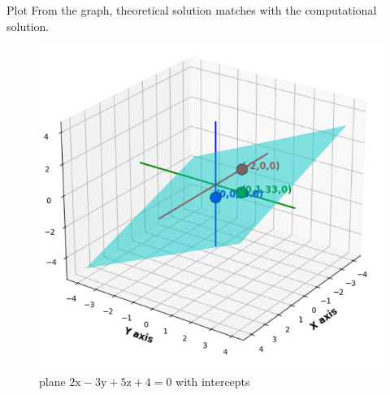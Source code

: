 \documentclass{beamer}
\begin{document}
\begin{frame}{Plot}
  From the graph, theoretical solution matches with the computational solution.

\begin{figure}[H]
\centering
\includegraphics[width=0.5\columnwidth]{figs/graph.png}
\caption*{plane $2\text{x} - 3\text{y} + 5\text{z} + 4 = 0$ with intercepts}
\label{fig:graph.png}
\end{figure}  
\end{frame}
\end{document}
